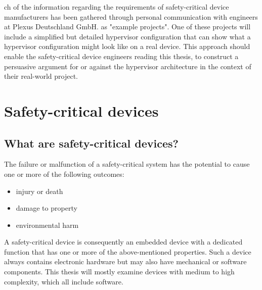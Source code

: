 ch of the information regarding the requirements of safety-critical device manufacturers has been gathered through personal communication with engineers at Plexus Deutschland GmbH. as "example projects". One of these projects will include a simplified but detailed hypervisor configuration that can show what a hypervisor configuration might look like on a real device. 
This approach should enable the safety-critical device engineers reading this thesis, to construct a persuasive argument for or against the hypervisor architecture in the context of their real-world project.

\section{Safety-critical devices}
\subsection{What are safety-critical devices?}
The failure or malfunction of a safety-critical system has the potential to cause one or more of the following outcomes:
\begin{itemize}
\item injury or death
\item damage to property
\item environmental harm
\end{itemize}
A safety-critical device is consequently an embedded device with a dedicated function that has one or more of the above-mentioned properties. Such a device always contains electronic hardware but may also have mechanical or software components. This thesis will mostly examine devices with medium to high complexity, which all include software.

